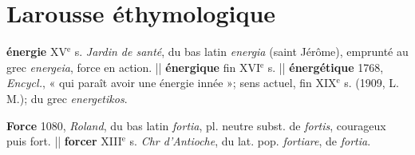 \section{Larousse éthymologique}
{\bf énergie }{\footnotesize XV}$^\text{e}$ s. {\it Jardin de santé}, du bas latin {\it energia} (saint Jérôme), emprunté au grec {\it energeia}, force en action. || {\bf énergique} fin {\footnotesize XVI}$^\text{e}$ s. || {\bf énergétique} 1768, {\it Encycl.}, « qui paraît avoir une énergie innée »; sens actuel, fin {\footnotesize XIX}$^\text{e}$ s. (1909, L. M.); du grec {\it energetikos}.

{\bf Force} 1080, {\it Roland}, du bas latin {\it fortia}, pl. neutre subst. de {\it fortis}, courageux puis fort. || {\bf forcer} {\footnotesize XIII}$^\text{e}$ s. {\it Chr d'Antioche}, du lat. pop. {\it fortiare}, de {\it fortia}.%
